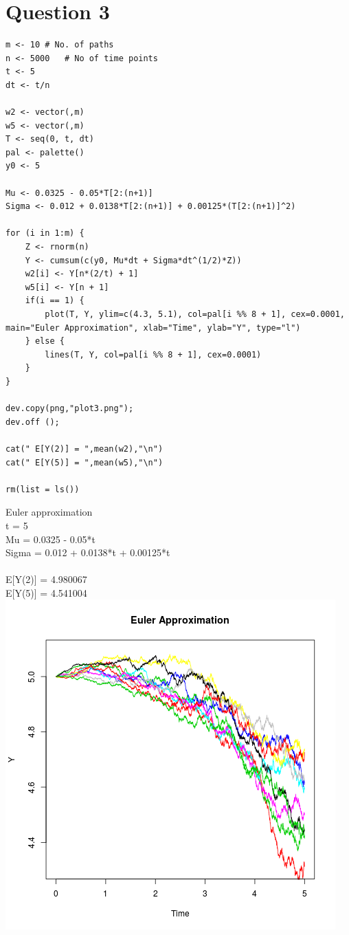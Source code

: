 \documentclass{article}
\begin{document}
\section{Question 3}


\begin{lstlisting}
m <- 10	# No. of paths
n <- 5000	# No of time points
t <- 5
dt <- t/n

w2 <- vector(,m)
w5 <- vector(,m)
T <- seq(0, t, dt)
pal <- palette()
y0 <- 5

Mu <- 0.0325 - 0.05*T[2:(n+1)]
Sigma <- 0.012 + 0.0138*T[2:(n+1)] + 0.00125*(T[2:(n+1)]^2)

for (i in 1:m) {
	Z <- rnorm(n)
	Y <- cumsum(c(y0, Mu*dt + Sigma*dt^(1/2)*Z))
	w2[i] <- Y[n*(2/t) + 1]
	w5[i] <- Y[n + 1]
	if(i == 1) {
		plot(T, Y, ylim=c(4.3, 5.1), col=pal[i %% 8 + 1], cex=0.0001, main="Euler Approximation", xlab="Time", ylab="Y", type="l")
	} else {
		lines(T, Y, col=pal[i %% 8 + 1], cex=0.0001)
	}
}

dev.copy(png,"plot3.png");
dev.off ();

cat(" E[Y(2)] = ",mean(w2),"\n")
cat(" E[Y(5)] = ",mean(w5),"\n")

rm(list = ls())
\end{lstlisting}
Euler approximation \\
t = 5 \\
Mu = 0.0325 - 0.05*t\\
Sigma = 0.012 + 0.0138*t + 0.00125*t\\\\
 E[Y(2)] =  4.980067 \\
 E[Y(5)] =  4.541004 \\
\includegraphics{"plot3"}
\end{document}
